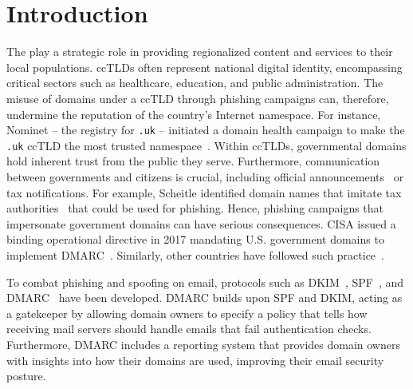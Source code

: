 \section{Introduction}
\label{sec:introduction}
The  play a strategic role in providing regionalized content and services to their local populations.
\glspl{ccTLD} often represent national digital identity, encompassing critical sectors such as healthcare, education, and public administration.
The misuse of domains under a \gls{ccTLD} through phishing campaigns can, therefore, undermine the reputation of the country's Internet namespace. For instance, Nominet -- the registry for \texttt{.uk} -- initiated a domain health campaign to make the \texttt{.uk} \gls{ccTLD} the most trusted namespace~\cite{Sanmogan_IntroducingDomainHealth_2025}.
Within \glspl{ccTLD}, governmental domains hold inherent trust from the public they serve.
Furthermore, communication between governments and citizens is crucial, including official announcements~\cite{Zaken_GovernmentCommunicationsPolicy_2018} or tax notifications.
For example, Scheitle \etal identified domain names that imitate tax authorities~\cite{ScheitleEtAl_RiseCertificateTransparency_2018} that could be used for phishing.
Hence, phishing campaigns that impersonate government domains can have serious consequences.
CISA issued a binding operational directive in 2017 mandating U.S. government domains to implement \gls{DMARC}~\cite{_BOD1801Enhance_2017}.
Similarly, other countries have followed such practice~\cite{_DMARCForumStandardization_,_BSITR03182Email_}.

To combat phishing and spoofing on email, protocols such as \gls{DKIM}~\cite{rfc6376}, \gls{SPF}~\cite{rfc7208}, and \gls{DMARC}~\cite{rfc7489} have been developed.
\gls{DMARC} builds upon \gls{SPF} and \gls{DKIM}, acting as a gatekeeper by allowing domain owners to specify a policy that tells how receiving mail servers should handle emails that fail authentication checks.
Furthermore, \gls{DMARC} includes a reporting system that provides domain owners with insights into how their domains are used, improving their email security posture.

